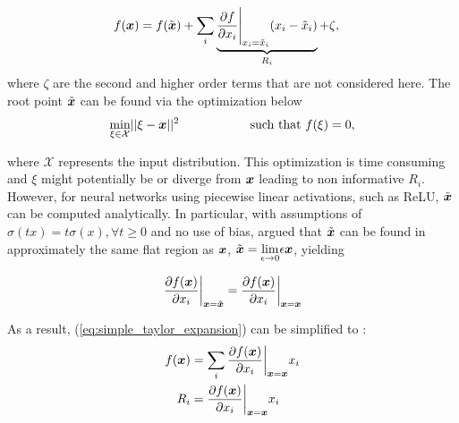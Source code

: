 
\begin{align} \label{eq:simple_taylor_expansion}
	f(\patvector{x}) 	&= f(\tilde{\patvector{x}}) + \sum_{i} \underbrace{\frac{\partial f }{ \partial x_i } \Bigg|_{x_i = \tilde{x}_i}  ( x_i - \tilde{x}_i ) }_{R_i} + \zeta, 
\end{align}
where $\zeta$ are the second and higher order terms that are not considered here. The root point $\tilde{\boldsymbol{x}}$ can be found via the optimization below 
\begin{align}
\underset{\xi \in \mathcal{X} }{\text{min}}  || \xi - \patvector{x} ||^2 \hspace{2cm}  \text{such that}\  f(\xi) = 0,
\end{align}

where $\mathcal{X}$ represents the input distribution. This optimization is time consuming  and $\xi$ might potentially be  or diverge from $\patvector{x}$ leading to non informative $R_i$. However, for neural networks using piecewise linear activations, such as ReLU,  $\tilde{\boldsymbol{x}}$ can be computed analytically. In particular, with assumptions of $\sigma(tx) = t\sigma(x) ,\forall t \ge 0$ and no use of bias, \cite{MontavonMethodsInterpretingUnderstanding2017} argued that $\tilde{\patvector{x}}$ can be found in  approximately the same flat region as $\patvector{x}$, $\tilde{\patvector{x}} = \underset{\epsilon \rightarrow 0 }{\lim} \epsilon \patvector{x}$, yielding

\begin{align}
	\frac{\partial f(\patvector{x})}{\partial x_i}\bigg|_{\patvector{x}={\tilde{\patvector{x}}}} = \frac{\partial f(\patvector{x})}{\partial x_i}\bigg|_{\patvector{x}={\patvector{x}}} 
\end{align}

%
As a result, (\ref{eq:simple_taylor_expansion}) can be simplified to :
\begin{align}
	f(\patvector{x}) &= \sum_{i} \frac{\partial f(\patvector{x})}{\partial x_i}\bigg|_{\patvector{x}={\patvector{x}}}  x_i \\
	R_i &= \frac{\partial f(\patvector{x})}{\partial x_i}\bigg|_{\patvector{x}={\patvector{x}}}  x_i \label{eq:simple_r_i}
\end{align} 

